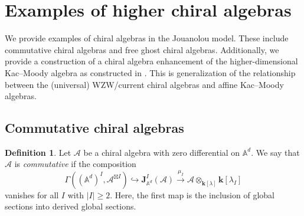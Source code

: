 \documentclass[11pt]{amsart}
\theoremstyle{definition}
\newtheorem{defn}[thm]{Definition}
\theoremstyle{remark}
\numberwithin{equation}{section}
\begin{document}
\section{Examples of higher chiral algebras}\label{s:example}

We provide examples of chiral algebras in the Jouanolou model.
These include commutative chiral algebras and free ghost chiral algebras.
Additionally, we provide a construction of a chiral algebra enhancement of the higher-dimensional Kac--Moody algebra as
constructed in \cite{FHK}.
This is generalization of the relationship between the (universal) WZW/current chiral algebras and affine Kac--Moody algebras.

\subsection{Commutative chiral algebras}

\begin{defn}
   Let $\mathcal{A}$ be a chiral algebra with zero differential on $\mathbb{A}^d$. We say that $\mathcal{A}$ is
   \textit{commutative} if the composition
$$
\Gamma\left((\mathbb{A}^d)^{{I}},\mathcal{A}^{\boxtimes {I}}\right)\hookrightarrow \mathbf{J}^{{I}}_{\mathbb{A}^d}(\mathcal{A})\xrightarrow{\mu_{{I}}}\mathcal{A}\otimes_{\mathbf{k}[\lambda]}\mathbf{k}[\lambda_I]
$$
    vanishes for all $I$ with $|I|\geq 2$.
    Here, the first map is the inclusion of global sections into derived global sections.
\end{defn}
\end{document}
